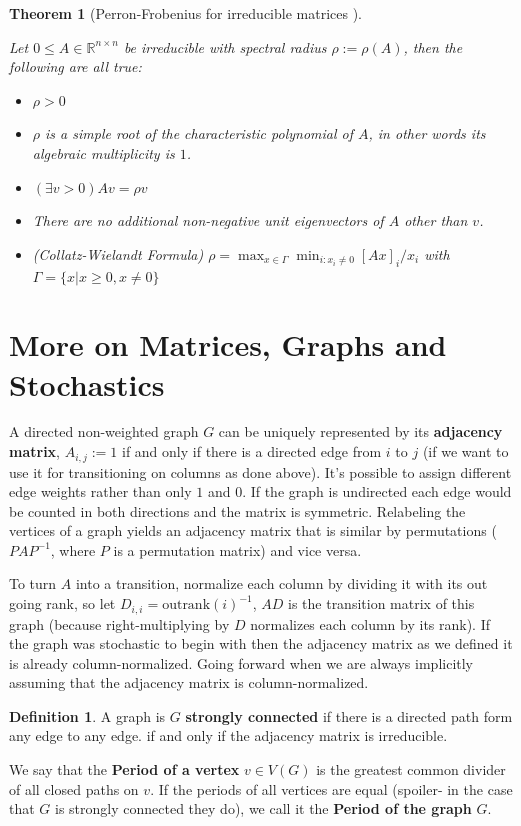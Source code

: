 \documentclass[a4paper,10pt]{article}
\newcommand{\R}{\mathbb{R}}
\newcommand{\gt}{>}
\theoremstyle{definition}
\newtheorem{mydef}{Definition}[section]
\theoremstyle{remark}
\theoremstyle{plain}
\newtheorem{thm}{Theorem}[section]
\begin{document}
\begin{thm}[Perron-Frobenius for irreducible matrices \autocite{meyer2000matrix}]
\label{thm:perron2}

Let $0 \leq A \in \R^{n \times n}$ be irreducible with spectral radius $\rho := \rho(A)$,
then the following are all true:
\begin{itemize}
\item{} $\rho \gt 0$
\item{} $\rho$ is a simple root of the characteristic polynomial of $A$,
in other words its algebraic multiplicity is $1$.
\item{} $(\exists v > 0) Av=\rho v$
\item{} There are no additional non-negative unit eigenvectors of $A$ other than
$v$. 
\item{(Collatz-Wielandt Formula)} $\rho = \max_{x \in \Gamma} \min_{i : x_i \neq 0} [Ax]_i / x_i$
with $\Gamma = \{x | x \geq 0, x \neq 0\}$
\end{itemize}
\end{thm}


\section{More on Matrices, Graphs and Stochastics}

A directed non-weighted graph $G$ can be uniquely represented by its
\textbf{adjacency matrix},
$A_{i,j} := 1$ if and only if there is a directed edge from $i$ to $j$ (if we
want to use it for transitioning on columns as done above). It's possible to
assign different edge weights rather than only $1$ and $0$. If the graph is
undirected each edge would be counted in both directions and the matrix is
symmetric.
Relabeling the vertices of a graph yields an adjacency matrix that is similar by
permutations ($PAP^{-1}$, where $P$ is a permutation matrix) and vice versa.

To turn $A$ into a transition, normalize each column by dividing it with
its out going rank, so let $D_{i,i} = \text{outrank}(i)^{-1}$, $AD$ is the
transition matrix of this graph (because right-multiplying by $D$ normalizes each
column by its rank).
If the graph was stochastic to begin with then the adjacency matrix as we
defined it is already column-normalized.
Going forward when we are always implicitly assuming that the adjacency matrix
is column-normalized.


\begin{mydef}
\label{def:stronglyconnected}
A graph is $G$ \textbf{strongly connected} if there is a directed path form any edge
to any edge. if and only if the adjacency matrix is irreducible.

We say that the \textbf{Period of a vertex} $v \in V(G)$ is the greatest common
divider of all closed paths on $v$. If the periods of all vertices are equal
(spoiler- in the case that $G$ is strongly connected they do), we call it the
\textbf{Period of the graph} $G$.
\end{mydef}
\end{document}
